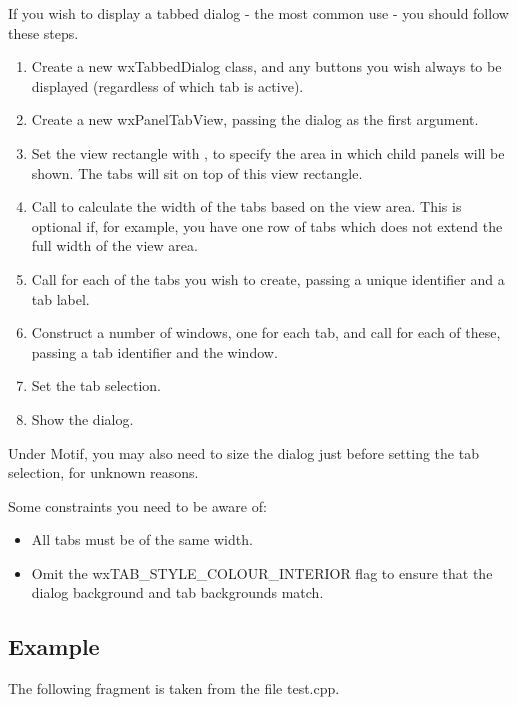 If you wish to display a tabbed dialog - the most common use - you should follow these steps.

\begin{enumerate}\itemsep=0pt
\item Create a new wxTabbedDialog class, and any buttons you wish always to be displayed
(regardless of which tab is active).
\item Create a new wxPanelTabView, passing the dialog as the first argument.
\item Set the view rectangle with ,
to specify the area in which child panels will be
shown. The tabs will sit on top of this view rectangle.
\item Call  to calculate
the width of the tabs based on the view area. This is optional if, for example, you have one row
of tabs which does not extend the full width of the view area.
\item Call  for each of the tabs you wish to create, passing
a unique identifier and a tab label.
\item Construct a number of windows, one for each tab, and call  for
each of these, passing a tab identifier and the window.
\item Set the tab selection.
\item Show the dialog.
\end{enumerate}

Under Motif, you may also need to size the dialog just before setting the tab selection, for unknown reasons.

Some constraints you need to be aware of:

\begin{itemize}\itemsep=0pt
\item All tabs must be of the same width.
\item Omit the wxTAB\_STYLE\_COLOUR\_INTERIOR flag to ensure that the dialog background
and tab backgrounds match.
\end{itemize}

\subsection{Example}

The following fragment is taken from the file test.cpp.

